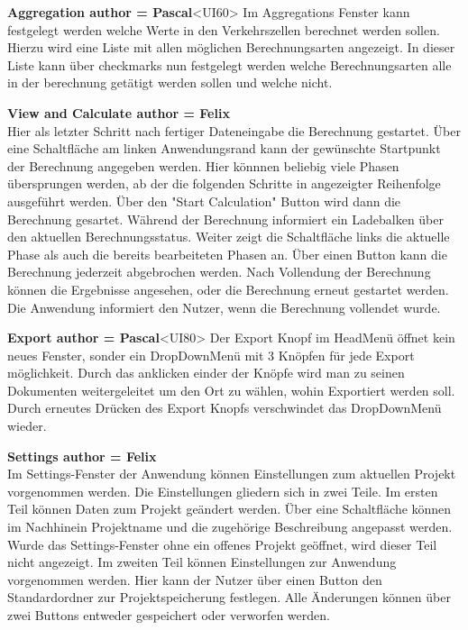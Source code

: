 \documentclass[parskip=full]{scrartcl} %
\begin{document}
\textbf{Aggregation author = Pascal}<UI60>
Im Aggregations Fenster kann festgelegt werden welche Werte in den Verkehrszellen berechnet werden sollen. Hierzu wird eine Liste mit allen möglichen Berechnungsarten angezeigt. In dieser Liste kann über checkmarks nun festgelegt werden welche Berechnungsarten alle in der berechnung getätigt werden sollen und welche nicht.

\textbf{View and Calculate author = Felix}\\
Hier als letzter Schritt nach fertiger Dateneingabe die Berechnung gestartet. Über eine Schaltfläche am linken Anwendungsrand kann der gewünschte Startpunkt der Berechnung angegeben werden. Hier könnnen beliebig viele Phasen übersprungen werden, ab der die folgenden Schritte in angezeigter Reihenfolge ausgeführt werden. Über den "Start Calculation" Button wird dann die Berechnung gesartet.
Während der Berechnung informiert ein Ladebalken über den aktuellen Berechnungsstatus. Weiter zeigt die Schaltfläche links die aktuelle Phase als auch die bereits bearbeiteten Phasen an. Über einen Button kann die Berechnung jederzeit abgebrochen werden.
Nach Vollendung der Berechnung können die Ergebnisse angesehen, oder die Berechnung erneut gestartet werden.
Die Anwendung informiert den Nutzer, wenn die Berechnung vollendet wurde.

\textbf{Export author = Pascal}<UI80>
Der Export Knopf im HeadMenü öffnet kein neues Fenster, sonder ein DropDownMenü mit 3 Knöpfen für jede Export möglichkeit. Durch das anklicken einder der Knöpfe wird man zu seinen Dokumenten weitergeleitet um den Ort zu wählen, wohin Exportiert werden soll.
Durch erneutes Drücken des Export Knopfs verschwindet das DropDownMenü wieder.

\textbf{Settings author = Felix}\\
Im Settings-Fenster der Anwendung können Einstellungen zum aktuellen Projekt vorgenommen werden.
Die Einstellungen gliedern sich in zwei Teile.
Im ersten Teil können Daten zum Projekt geändert werden. Über eine Schaltfläche können im Nachhinein Projektname und die zugehörige Beschreibung angepasst werden. Wurde das Settings-Fenster ohne ein offenes Projekt geöffnet, wird dieser Teil nicht angezeigt.
Im zweiten Teil können Einstellungen zur Anwendung vorgenommen werden. Hier kann der Nutzer über einen Button den Standardordner zur Projektspeicherung festlegen.
Alle Änderungen können über zwei Buttons entweder gespeichert oder verworfen werden.

\newpage
\end{document}
